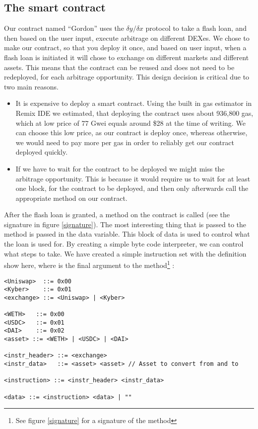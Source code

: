 \subsection{The smart contract}
Our contract named ``Gordon'' uses the $\delta y/\delta x$ protocol to take a
flash loan, and then based on the user input, execute arbitrage on different
DEXes. We chose to make our contract, so that you deploy it once, and based on
user input, when a flash loan is initiated it will chose to exchange on different
markets and different assets. This means that the contract can be reused and
does not need to be redeployed, for each arbitrage opportunity. This design
decision is critical due to two main reasons.
\begin{itemize}
    \item It is expensive to deploy a smart contract. Using the built in gas
        estimator in Remix IDE we estimated, that deploying the contract uses
        about 936,800 gas, which at low price of 77 Gwei equals around
        \$28 at the time of writing. We can choose this low price, as our
        contract is deploy once, whereas otherwise, we would need to pay more
        per gas in order to reliably get our contract deployed quickly.
    \item If we have to wait for the contract to be deployed we might miss the
        arbitrage opportunity. This is because it would require us to wait for
        at least one block, for the contract to be deployed, and then only
        afterwards call the appropriate method on our contract.
\end{itemize}

\noindent After the flash loan is granted, a method on the contract is called
(see the signature in figure \ref{signature}). The most interesting thing that
is passed to the method is passed in the data variable. This block of data is
used to control what the loan is used for. By creating a simple byte code
interpreter, we can control what steps to take. We have created a simple
instruction set with the definition show here, where  is the final
argument to the method\footnote{See figure \ref{signature} for a signature of
the method} :

\begin{samepage}
\begin{verbatim}
<Uniswap>  ::= 0x00
<Kyber>    ::= 0x01
<exchange> ::= <Uniswap> | <Kyber>

<WETH>   ::= 0x00
<USDC>   ::= 0x01
<DAI>    ::= 0x02
<asset> ::= <WETH> | <USDC> | <DAI>

<instr_header> ::= <exchange>
<instr_data>   ::= <asset> <asset> // Asset to convert from and to

<instruction> ::= <instr_header> <instr_data>

<data> ::= <instruction> <data> | ""
\end{verbatim}
\end{samepage}

